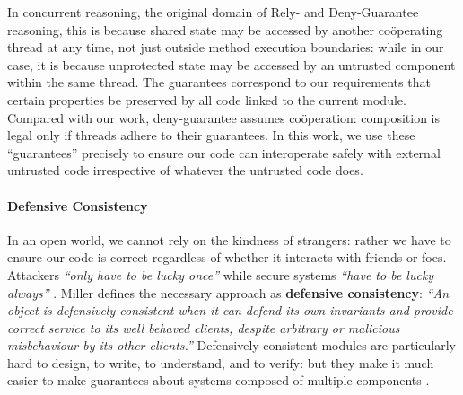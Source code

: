 In concurrent reasoning, the original domain of Rely- and
Deny-Guarantee reasoning, this is because shared state may be accessed
by another co{\"o}perating thread at any time, not just outside method
execution boundaries: while in our case, it is because unprotected
state may be accessed by an untrusted component within the same
thread.  The guarantees correspond to our requirements that certain
properties be preserved by all code linked to the current
module. Compared with our work, deny-guarantee assumes
co{\"o}peration: composition is legal only if threads adhere to their
guarantees. In this work, we use these ``guarantees'' precisely to
ensure our code can interoperate safely with external untrusted code
irrespective of whatever the untrusted code does.







\paragraph{Defensive Consistency}


In an open world, we cannot rely on the kindness of strangers: rather
we have to ensure our code is correct regardless of whether it
interacts with friends or foes.
Attackers 
\textit{``only have to be lucky once''} while secure systems 
\textit{``have to be lucky always''} \cite{IRAThatcher}.
Miller \cite{miller-esop2013,MillerPhD} defines the necessary approach
as \textbf{defensive consistency}: \textit{``An object is defensively
  consistent when it can defend its own invariants and provide correct
  service to its well behaved clients, despite arbitrary or malicious
  misbehaviour by its other clients.''}  Defensively consistent
modules are particularly hard to design, to write, to understand, and
to verify: but
they make it much
easier to make guarantees about systems composed of multiple components
\cite{Murray10dphil}.

